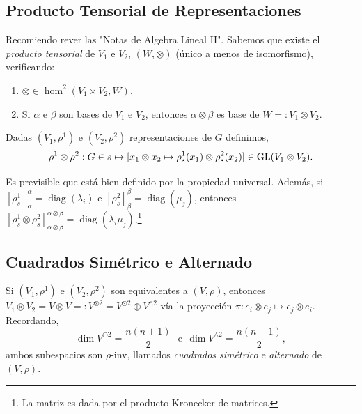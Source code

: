 \subsection*{Producto Tensorial de Representaciones}

Recomiendo rever las "Notas de Algebra Lineal II". Sabemos que existe el \emph{producto tensorial} de \(V_1\) e \(V_2\), \((W, \otimes)\) (único a menos de isomorfismo), verificando:     
\vspace{-0.3cm}
\begin{enumerate}[label = \roman*.]
    \item  \(\otimes \in \hom^2(V_1\times V_2,W) \).
    \item Si \(\alpha \) e \(\beta\) son bases de \(V_1\) e \(V_2\), entonces \(\alpha \otimes \beta \) es base de \(W =: V_1 \otimes V_2\). 
\end{enumerate}

\vspace{-0.2cm}
\begin{definition}
    Dadas \((V_1, \rho^1)\) e \((V_2, \rho^2)\) representaciones de \(G\) definimos, 
    \[\rho^1 \otimes \rho^2 : G \in s \mapsto [x_1 \otimes x_2 \mapsto \rho_s^1(x_1) \otimes \rho_s^2(x_2)] \in \operatorname{GL}(V_1 \otimes V_2). \] 
\end{definition}

\vspace{-0.2cm}
\begin{note}
    Es previsible que está bien definido por la propiedad universal. Además, si \([\rho_s^1]_\alpha^\alpha =  \operatorname{diag}(\lambda_i)\) e \([\rho_s^2]_\beta^\beta =\operatorname{diag} (\mu_j) \), entonces \([\rho_s^1 \otimes \rho_s^2]^{\alpha \otimes \beta}_{\alpha \otimes \beta} = \operatorname{diag}(\lambda_i \mu_j)\).\footnote{La matriz es dada por el producto Kronecker de matrices.}
\end{note}

\subsection*{Cuadrados Simétrico e Alternado}

Si \((V_1,\rho^1) \) e \( (V_2, \rho^2)\) son equivalentes a \((V,\rho)\), entonces \(V_1 \otimes V_2 = V \otimes V =:V^{\otimes 2} = V^{\odot 2} \oplus V^{\wedge 2}\) vía la proyección \(\pi: e_i \otimes e_j \mapsto e_j \otimes e_i\). Recordando, 
\[\dim V^{\odot 2} = \frac{n(n+1)}{2}  \ \ \  \text{e} \ \ \dim V^{\wedge 2} = \frac{n(n-1)}{2},\]
ambos subespacios son \(\rho\)-inv, llamados \emph{cuadrados simétrico} e \emph{alternado} de \((V, \rho)\).%
